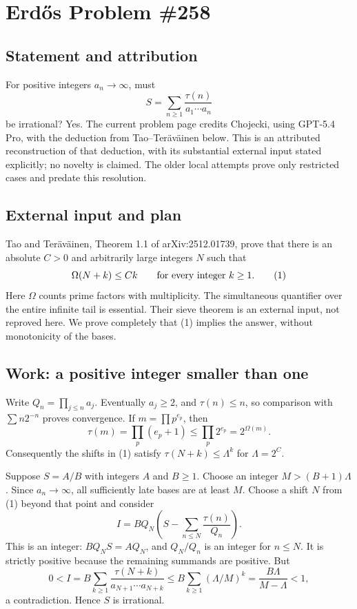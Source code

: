 \section{Erd\H{o}s Problem \#258}
\subsection{Statement and attribution}
For positive integers $a_n\to\infty$, must
\[
 S=\sum_{n\ge1}\frac{\tau(n)}{a_1\cdots a_n}
\]
be irrational? Yes. The current problem page credits Chojecki, using GPT-5.4 Pro, with the deduction from Tao--Ter\"av\"ainen below. This is an attributed reconstruction of that deduction, with its substantial external input stated explicitly; no novelty is claimed. The older local attempts prove only restricted cases and predate this resolution.

\subsection{External input and plan}
Tao and Ter\"av\"ainen, Theorem 1.1 of arXiv:2512.01739, prove that there is an absolute $C>0$ and arbitrarily large integers $N$ such that
\[
 \Omega(N+k)\le Ck\qquad\hbox{for every integer }k\ge1.
 \tag{1}
\]
Here $\Omega$ counts prime factors with multiplicity. The simultaneous quantifier over the entire infinite tail is essential. Their sieve theorem is an external input, not reproved here. We prove completely that (1) implies the answer, without monotonicity of the bases.

\subsection{Work: a positive integer smaller than one}
Write $Q_n=\prod_{j\le n}a_j$. Eventually $a_j\ge2$, and $\tau(n)\le n$, so comparison with $\sum n2^{-n}$ proves convergence. If $m=\prod p^{e_p}$, then
\[
 \tau(m)=\prod_p(e_p+1)\le\prod_p2^{e_p}=2^{\Omega(m)}.
\]
Consequently the shifts in (1) satisfy $\tau(N+k)\le\Lambda^k$ for $\Lambda=2^C$.

Suppose $S=A/B$ with integers $A$ and $B\ge1$. Choose an integer $M>(B+1)\Lambda$. Since $a_n\to\infty$, all sufficiently late bases are at least $M$. Choose a shift $N$ from (1) beyond that point and consider
\[
 I=BQ_N\left(S-\sum_{n\le N}\frac{\tau(n)}{Q_n}\right).
\]
This is an integer: $BQ_NS=AQ_N$, and $Q_N/Q_n$ is an integer for $n\le N$. It is strictly positive because the remaining summands are positive. But
\[
 0<I=B\sum_{k\ge1}\frac{\tau(N+k)}{a_{N+1}\cdots a_{N+k}}
 \le B\sum_{k\ge1}(\Lambda/M)^k
 =\frac{B\Lambda}{M-\Lambda}<1,
\]
a contradiction. Hence $S$ is irrational.

